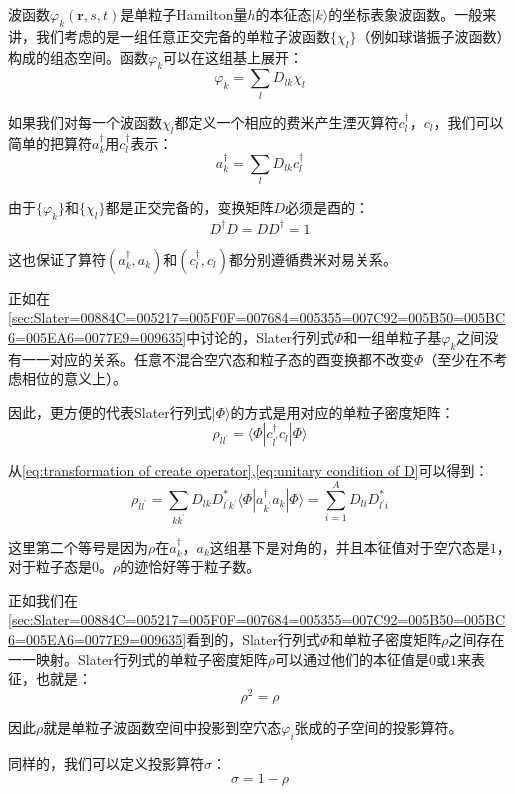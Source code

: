 波函数$\varphi_{k}(\boldsymbol{r},s,t)$是单粒子Hamilton量$h$的本征态$|k\rangle$的坐标表象波函数。一般来讲，我们考虑的是一组任意正交完备的单粒子波函数$\{\chi_{l}\}$（例如球谐振子波函数）构成的组态空间。函数$\varphi_{k}$可以在这组基上展开：
\[
\varphi_{k}=\sum_{l}D_{lk}\chi_{l}
\]

如果我们对每一个波函数$\chi_{l}$都定义一个相应的费米产生湮灭算符$c^{\dagger}_{l}$，$c_{l}$，我们可以简单的把算符$a^{\dagger}_{k}$用$c^{\dagger}_{l}$表示：
\begin{equation}
a^{\dagger}_{k}=\sum_{l}D_{lk}c^{\dagger}_{l}\label{eq:transformation of create operator}
\end{equation}

由于$\{\varphi_{k}\}$和$\{\chi_{l}\}$都是正交完备的，变换矩阵$D$必须是酉的：
\begin{equation}
D^{\dagger}D=DD^{\dagger}=1\label{eq:unitary condition of D}
\end{equation}

这也保证了算符$(a^{\dagger}_{k},a_{k})$和$(c^{\dagger}_{l},c_{l})$都分别遵循费米对易关系。

正如在\ref{sec:Slater=00884C=005217=005F0F=007684=005355=007C92=005B50=005BC6=005EA6=0077E9=009635}中讨论的，Slater行列式$\Phi$和一组单粒子基$\varphi_{k}$之间没有一一对应的关系。任意不混合空穴态和粒子态的酉变换都不改变$\Phi$（至少在不考虑相位的意义上）。

因此，更方便的代表Slater行列式$|\Phi\rangle$的方式是用对应的单粒子密度矩阵：
\[
\rho_{ll^{\prime}}=\langle\Phi|c^{\dagger}_{l^{\prime}}c_{l}|\Phi\rangle
\]

从\ref{eq:transformation of create operator},\ref{eq:unitary condition of D}可以得到：
\[
\rho_{ll^{\prime}}=\sum_{kk^{\prime}}D_{lk}D^{*}_{l^{\prime}k^{\prime}}\langle\Phi|a^{\dagger}_{k^{\prime}}a_{k}|\Phi\rangle=\sum^{A}_{i=1}D_{li}D^{*}_{l^{\prime}i}
\]

这里第二个等号是因为$\rho$在$a^{\dagger}_{k}$，$a_{k}$这组基下是对角的，并且本征值对于空穴态是$1$，对于粒子态是$0$。$\rho$的迹恰好等于粒子数。

正如我们在\ref{sec:Slater=00884C=005217=005F0F=007684=005355=007C92=005B50=005BC6=005EA6=0077E9=009635}看到的，Slater行列式$\Phi$和单粒子密度矩阵$\rho$之间存在一一映射。Slater行列式的单粒子密度矩阵$\rho$可以通过他们的本征值是$0$或$1$来表征，也就是：
\[
\rho^{2}=\rho
\]

因此$\rho$就是单粒子波函数空间中投影到空穴态$\varphi_{i}$张成的子空间的投影算符。

同样的，我们可以定义投影算符$\sigma$：
\[
\sigma=1-\rho
\]

